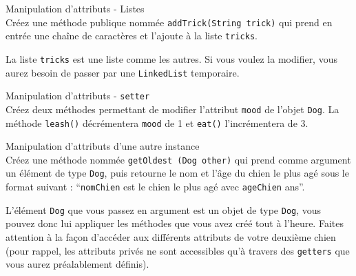 \begin{Exercice}[5 minutes] Manipulation d'attributs - Listes\\
    Créez une méthode publique nommée \lstinline{addTrick(String trick)} qui prend en entrée une chaîne de caractères et l'ajoute à la liste \lstinline{tricks}. \\
   	
\begin{conseil}
   La liste \lstinline{tricks} est une liste comme les autres. Si vous voulez la modifier, vous aurez besoin de passer par une \lstinline{LinkedList} temporaire.
\end{conseil}
    
\begin{solution}
	
\end{solution}
\end{Exercice}

\begin{Exercice}[5 minutes] Manipulation d'attributs - \lstinline{setter}\\
    Créez deux méthodes permettant de modifier l'attribut \lstinline{mood} de l'objet \lstinline{Dog}. La méthode \lstinline{leash()} décrémentera \lstinline{mood} de 1 et \lstinline{eat()} l'incrémentera de 3. \\

\begin{solution}
	
\end{solution}
\end{Exercice}

\begin{Exercice}[5 minutes] Manipulation d'attributs d'une autre instance\\
    Créez une méthode nommée \lstinline{getOldest (Dog other)} qui prend comme argument un élément de type \lstinline{Dog}, puis retourne le nom et l'âge du chien le plus agé sous le format suivant : ``\lstinline{nomChien} est le chien le plus agé avec \lstinline{ageChien} ans''. \\
   	
\begin{conseil}
   L'élément \lstinline{Dog} que vous passez en argument est un objet de type \lstinline{Dog}, vous pouvez donc lui appliquer les méthodes que vous avez créé tout à l'heure.
   Faites attention à la façon d'accéder aux différents attributs de votre deuxième chien (pour rappel, les attributs privés ne sont accessibles qu'à travers des \lstinline{getters} que vous aurez préalablement définis).
\end{conseil}
    
\begin{solution}
	
\end{solution}
\end{Exercice}

